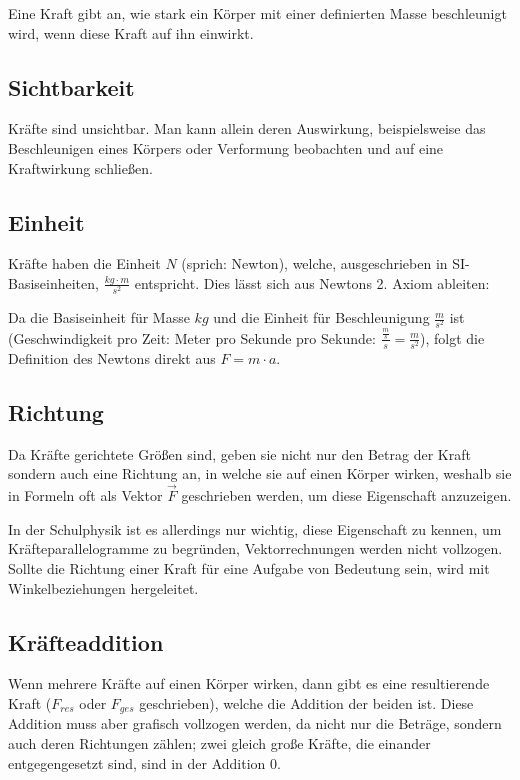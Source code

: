 Eine Kraft gibt an, wie stark ein Körper mit einer definierten Masse beschleunigt wird, wenn diese Kraft auf ihn einwirkt. 


\subsection{Sichtbarkeit}

Kräfte sind unsichtbar. Man kann allein deren Auswirkung, beispielsweise das Beschleunigen eines Körpers oder Verformung beobachten und auf eine Kraftwirkung schließen.


\subsection{Einheit}

Kräfte haben die Einheit $N$ (sprich: \glqq Newton\grqq ), welche, ausgeschrieben in SI-Basiseinheiten, $\frac{kg \cdot m}{s^2}$ entspricht. Dies lässt sich aus Newtons 2. Axiom ableiten:

Da die Basiseinheit für Masse $kg$ und die Einheit für Beschleunigung $\frac{m}{s^2}$ ist (Geschwindigkeit pro Zeit: Meter pro Sekunde pro Sekunde: $\frac{\frac{m}{s}}{s}=\frac{m}{s^2}$), folgt die Definition des Newtons direkt aus $F = m \cdot a$.


\subsection{Richtung}

Da Kräfte gerichtete Größen sind, geben sie nicht nur den Betrag der Kraft sondern auch eine Richtung an, in welche sie auf einen Körper wirken, weshalb sie in Formeln oft als Vektor $\vec{F}$ geschrieben werden, um diese Eigenschaft anzuzeigen.

\begin{Anmerkung}
In der Schulphysik ist es allerdings nur wichtig, diese Eigenschaft zu kennen, um Kräfteparallelogramme zu begründen, Vektorrechnungen werden nicht vollzogen. Sollte die Richtung einer Kraft für eine Aufgabe von Bedeutung sein, wird mit Winkelbeziehungen hergeleitet.
\end{Anmerkung}

\subsection{Kräfteaddition} \label{subsec:kraefteaddition}

Wenn mehrere Kräfte auf einen Körper wirken, dann gibt es eine resultierende Kraft ($F_{res}$ oder $F_{ges}$ geschrieben), welche die Addition der beiden ist. Diese Addition muss aber grafisch vollzogen werden, da nicht nur die Beträge, sondern auch deren Richtungen zählen; zwei gleich große Kräfte, die einander entgegengesetzt sind, sind in der Addition $0$.

